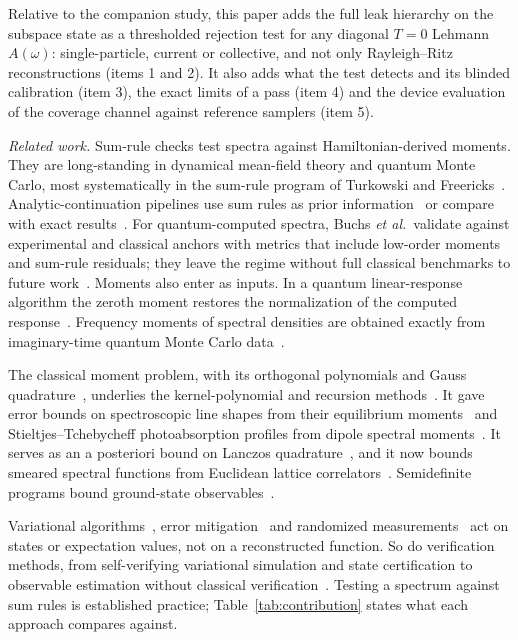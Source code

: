 \documentclass[submission, PhysCore]{SciPost}
\begin{document}
Relative to the companion study, this paper adds the full leak hierarchy on the subspace state as a thresholded rejection test for any diagonal $T=0$ Lehmann $A(\omega)$: single-particle, current or collective, and not only Rayleigh--Ritz reconstructions (items 1 and 2). It also adds what the test detects and its blinded calibration (item 3), the exact limits of a pass (item 4) and the device evaluation of the coverage channel against reference samplers (item 5).

\emph{Related work.} Sum-rule checks test spectra against Hamiltonian-derived moments. They are long-standing in dynamical mean-field theory and quantum Monte Carlo, most systematically in the sum-rule program of Turkowski and Freericks~\cite{TurkowskiFreericks2006,Freericks2009}. Analytic-continuation pipelines use sum rules as prior information~\cite{Jarrell1996} or compare with exact results~\cite{Sandvik1998}. For quantum-computed spectra, Buchs \emph{et al.}\ validate against experimental and classical anchors with metrics that include low-order moments and sum-rule residuals; they leave the regime without full classical benchmarks to future work~\cite{Buchs2026}. Moments also enter as inputs. In a quantum linear-response algorithm the zeroth moment restores the normalization of the computed response~\cite{RoggeroCarlson2019}. Frequency moments of spectral densities are obtained exactly from imaginary-time quantum Monte Carlo data~\cite{Dornheim2023moments}.

The classical moment problem, with its orthogonal polynomials and Gauss quadrature~\cite{ShohatTamarkin1943,Akhiezer1965,KreinNudelman1977,Simon1998,GM2010,Szego1975,GolubWelsch1969,Nevai1986,Lanczos1950}, underlies the kernel-polynomial and recursion methods~\cite{KPM2006,Haydock1972,Silver1996,Holzner2011}. It gave error bounds on spectroscopic line shapes from their equilibrium moments~\cite{Gordon1968} and Stieltjes--Tchebycheff photoabsorption profiles from dipole spectral moments~\cite{Langhoff1976}. It serves as an a posteriori bound on Lanczos quadrature~\cite{ChenTrogdonUbaru2021}, and it now bounds smeared spectral functions from Euclidean lattice correlators~\cite{AbbottJayOare2025,CausalBootstrap2026,CertifiedSpectral2026}. Semidefinite programs bound ground-state observables~\cite{WangAcin2024,Mortimer2026}.

Variational algorithms~\cite{Peruzzo2014,Cerezo2021,Bharti2022}, error mitigation~\cite{TemmeBravyi2017,Kandala2019,EndoBenjaminLi2018,vandenBerg2023,Cai2023} and randomized measurements~\cite{HuangKuengPreskill2020,Elben2023} act on states or expectation values, not on a reconstructed function. So do verification methods, from self-verifying variational simulation and state certification to observable estimation without classical verification~\cite{Kokail2019,HuangPreskillSoleimanifar2024,OEACV2026,Kraft2026}. Testing a spectrum against sum rules is established practice; Table~\ref{tab:contribution} states what each approach compares against.
\end{document}
